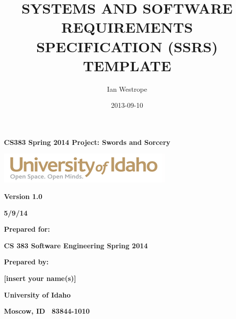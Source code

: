 \documentclass[twoside,letterpaper,pdftex]{article}
\title{SYSTEMS AND SOFTWARE REQUIREMENTS SPECIFICATION (SSRS) TEMPLATE}
\author{Ian Westrope}
\date{2013-09-10}
\begin{document}


\bigskip

{\centering\bfseries
CS383 Spring 2014 Project: Swords and Sorcery
\par}


\bigskip


\bigskip


\bigskip

{\centering\bfseries
{}
\par}

\begin{center}
\includegraphics[width=3.4362in,height=0.6134in]{uislogan.png}
\end{center}

\bigskip


\bigskip

{\centering\bfseries
Version 1.0
\par}

{\centering\bfseries
5/9/14
\par}


\bigskip


\bigskip

{\centering\bfseries
Prepared for:
\par}

{\centering\bfseries
CS 383	Software Engineering Spring 2014
\par}


\bigskip


\bigskip

{\centering\bfseries
Prepared by:
\par}

{\centering\bfseries
[insert your name(s)]
\par}

{\centering\bfseries
University of Idaho
\par}

{\centering\bfseries
Moscow, ID \ 83844-1010
\par}


\end{document}
